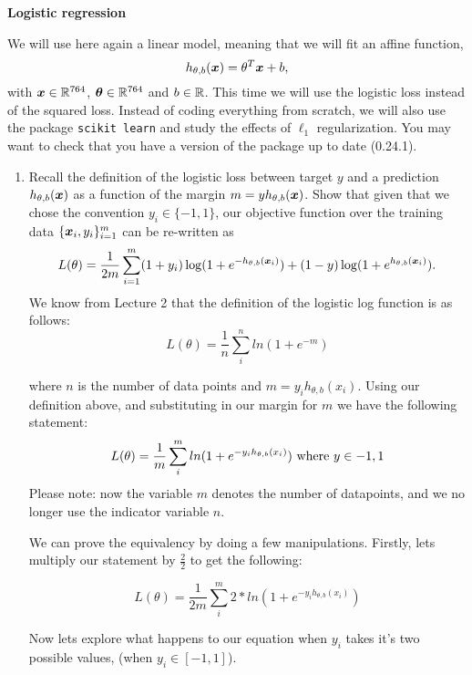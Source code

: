 \documentclass{article}
\begin{document}
{\color{nyupurple} \large \bf Logistic regression}  

We will use here again a linear model, meaning that we will fit an affine function,
\[
h_{\theta, b}(\boldsymbol{x}) = \theta^T\boldsymbol{x} + b,
\]
with $\boldsymbol{x} \in \mathbb{R}^{764}$, $\boldsymbol{\theta} \in \mathbb{R}^{764}$ and $b\in \mathbb{R}$.
This time we will use the logistic loss instead of the squared loss. Instead of coding everything from scratch, we will also use the package \texttt{scikit learn} and study the effects of $\ell_1$ regularization. You may want to check that you have a version of the package up to date (0.24.1).

\begin{enumerate}
\setcounter{enumi}{\value{saveenum}}
  \item Recall the definition of the logistic loss between target $y$ and a prediction $h_{\theta, b}(\boldsymbol{x})$ as a function of the margin $m = y h_{\theta, b}(\boldsymbol{x})$. Show that given that we chose the convention $y_i\in\{-1,1\}$, our objective function over the training data $\{\boldsymbol{x}_i, y_i\}_{i=1}^m$ can be re-written as
  \[
    L(\theta) = \frac 1 {2 m} \sum_{i=1}^m  (1 + y_i) \log ( 1 + e^{- h_{\theta, b}(\boldsymbol{x}_i)}) +  (1 - y) \log(1 + e^{h_{\theta, b}(\boldsymbol{x}_i)}).
    \]
We know from Lecture 2 that the definition of the logistic log function is as follows:
$$ L(\theta) = \frac{1}{n}\sum_i^{n}ln(1 +e^{-m}) $$

    where $n$ is the number of data points and $ m =  y_i h_{\theta, b}(x_i) $. Using our definition above, and substituting in our margin for $m$ we have the following statement: 
    $$ L(\theta) = \frac{1}{m}\sum_i^{m}ln(1 +e^{-y_ih_{\theta, b}(x_i)}) \space \text{ where } \space y \space \in {-1,1}$$
    Please note: now the variable $m$ denotes the number of datapoints, and we no longer use the indicator variable $n$. 
    
    We can prove the equivalency by doing a few manipulations. Firstly, lets multiply our statement by $\frac{2}{2}$ to get the following:
    
    $$ L(\theta) = \frac{1}{2m}\sum_i^{m} 2*ln(1 +e^{-y_ih_{\theta, b}(x_i)})$$
    
    Now lets explore what happens to our equation when $y_i$ takes it's two possible values,  (when $y_i \in [-1,1]$). 
    

\end{enumerate}
\end{document}
